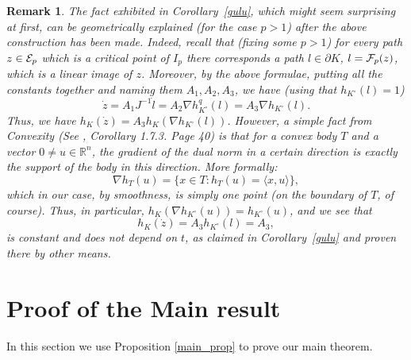 \documentclass[12pt]{article}
\newtheorem{remark}[lemma]{Remark}
\def\R{{\mathbb R}}
\begin{document}
\begin{remark}\label{schnei} {\rm
The fact exhibited in Corollary~\ref{gulu}, which might seem
surprising at first, can be geometrically explained (for the case
$p>1$) after the above construction has been made. Indeed, recall
that (fixing some $p>1$) for every path $z \in {\cal E}_p$ which is
a critical point of $I_p$ there corresponds a path $l \in \partial
K$, $l = {\cal F}_p(z)$, which is a linear image of $z$. Moreover,
by the above formulae, putting all the constants together and naming
them $A_1,A_2,A_3$, we have (using that $h_{K^{\circ}}(l) = 1$)
\[\dot z = A_1 J^{-1}\dot{l} = A_2 \nabla h_{K^{\circ}}^q (l) =
A_3  \nabla h_{K^{\circ}} (l).\]
Thus,  we have $h_K(\dot{z}) = A_3h_K( \nabla h_{K^{\circ}} (l))$.
%
However, a simple fact from Convexity (See \cite{Sch}, Corollary
1.7.3. Page 40) is that for a convex body $T$ and a vector $0\neq
u\in \R^n$, the gradient of the dual norm in a certain direction is
exactly the support of the body in this direction. More formally:
%
\[ \nabla h_{T}(u)= \{ x \in T : h_T(u) = \langle x,
u\rangle\},\] which in our case, by smoothness, is simply one point
(on the boundary of $T$, of course).
%
Thus, in particular, $h_K(\nabla h_{K^{\circ}}(u)) =
h_{K^{\circ}}(u)$,
and we see that
\[h_K(\dot{z}) = A_3 h_{K^{\circ}}(l) = A_3,\]
is constant and does not depend on $t$, as claimed in
Corollary~\ref{gulu} and proven there by other means. }
\end{remark}









\section{Proof of the Main result} \label{sec-proof-MR}

In this section we use Proposition \ref{main_prop} to prove our main
theorem.
\end{document}
